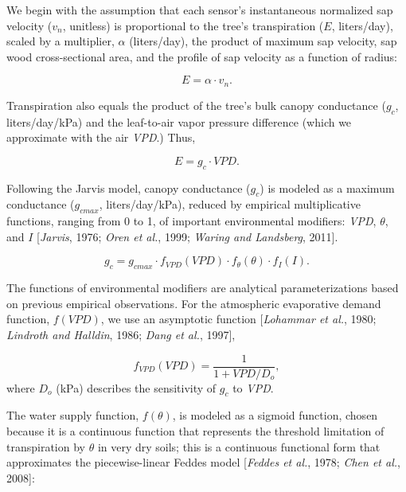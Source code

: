 We begin with the assumption that each sensor's instantaneous normalized sap velocity ($v_n$, unitless) is proportional to the tree's transpiration ($E$, liters/day), scaled by a multiplier, $\alpha$ (liters/day), the product of maximum sap velocity, sap wood cross-sectional area, and the profile of sap velocity as a function of radius:

\begin{equation} %
E = \alpha \cdot v_n.
\end{equation}

Transpiration also equals the product of the tree's bulk canopy conductance ($g_c$, liters/day/kPa) and the leaf-to-air vapor pressure difference (which we approximate with the air \textit{VPD}.)  Thus,

\begin{equation} %
E = g_c \cdot VPD.
\end{equation}

Following the Jarvis model, canopy conductance ($g_c$) is modeled as a maximum conductance ($g_{cmax}$, liters/day/kPa), reduced by empirical multiplicative functions, ranging from 0 to 1, of important environmental modifiers: \textit{VPD}, $\theta$, and $I$ [\textit{Jarvis}, 1976; \textit{Oren et al.}, 1999; \textit{Waring and Landsberg}, 2011].

\begin{equation}  %
g_c = g_{cmax} \cdot f_{VPD}(VPD) \cdot f_{\theta}(\theta) \cdot f_I(I).
\end{equation}

The functions of environmental modifiers are analytical parameterizations based on previous empirical observations.  For the atmospheric evaporative demand function, $f(VPD)$, we use an asymptotic function [\textit{Lohammar et al.}, 1980; \textit{Lindroth and Halldin}, 1986; \textit{Dang et al.}, 1997],

\begin{equation}  %
f_{VPD}(VPD) = \frac{1}{1+VPD/D_o},
\label{eqn:sapflow_fVPD}
\end{equation}
where $D_o$ (kPa) describes the sensitivity of $g_c$ to \textit{VPD}.

The water supply function, $f(\theta)$, is modeled as a sigmoid function, chosen because it is a continuous function that represents the threshold limitation of transpiration by $\theta$ in very dry soils; this is a continuous functional form that approximates the piecewise-linear Feddes model [\textit{Feddes et al.}, 1978; \textit{Chen et al.}, 2008]:

